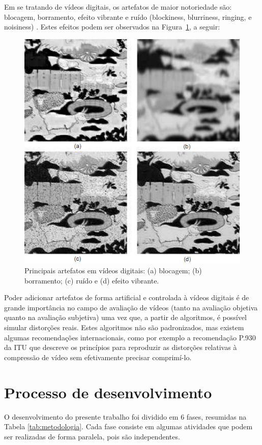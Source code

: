Em se tratando de vídeos digitais, os artefatos de maior notoriedade são: blocagem, borramento, efeito vibrante e ruído (blockiness, blurriness, ringing, e noisiness) \cite{farias2007}. Estes efeitos podem ser observados na Figura~\ref{fig:artefatosdigitais}, a seguir:

\begin{figure}[!htb]
	\centering
	\includegraphics[scale=0.45]{./imgs/figura1.png}
	\caption{Principais artefatos em vídeos digitais: (a) blocagem; (b) borramento; (c) ruído e (d) efeito vibrante.}
	\label{fig:artefatosdigitais}
\end{figure}


Poder adicionar artefatos de forma artificial e controlada à vídeos digitais é de grande importância no campo de avaliação de vídeos (tanto na avaliação objetiva quanto na avaliação subjetiva) uma vez que, a partir de algoritmos, é possível simular distorções reais. Estes algoritmos não são padronizados, mas existem algumas recomendações internacionais, como por exemplo a recomendação P.930 da ITU \cite{itup930} que descreve os princípios para reproduzir as distorções relativas à compressão de vídeo sem efetivamente precisar comprimí-lo.

\chapter{Processo de desenvolvimento}
O desenvolvimento do presente trabalho foi dividido em 6 fases, resumidas na Tabela \ref{tab:metodologia}. Cada fase consiste em algumas atividades que podem ser realizadas de forma paralela, pois são independentes.

